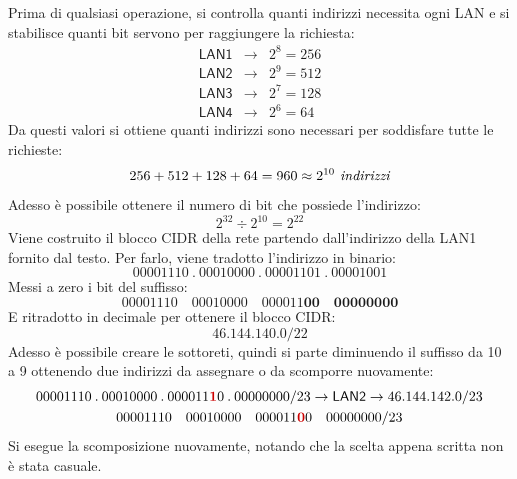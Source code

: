 \documentclass[a4paper]{article}
\newcommand{\binaryaddress}[4]{#1 \hspace{1em} #2 \hspace{1em} #3 \hspace{1em} #4}
\newcommand{\binaryaddresspointed}[4]{#1\:.\:#2\:.\:#3\:.\:#4}
\begin{document}
	\noindent
	Prima di qualsiasi operazione, si controlla quanti indirizzi necessita ogni \textsf{LAN} e si stabilisce quanti bit servono per raggiungere la richiesta:
	\begin{equation*}
		\begin{array}{lll}
			\textsf{LAN1} & \longrightarrow & 2^{8} = 256 \\
			\textsf{LAN2} & \longrightarrow & 2^{9} = 512 \\
			\textsf{LAN3} & \longrightarrow & 2^{7} = 128 \\
			\textsf{LAN4} & \longrightarrow & 2^{6} = 64
		\end{array}
	\end{equation*}
	Da questi valori si ottiene quanti indirizzi sono necessari per soddisfare tutte le richieste:
	\begin{equation*}
		256 + 512 + 128 + 64 = 960 \approx 2^{10} \emph{ indirizzi}
	\end{equation*}
	Adesso è possibile ottenere il numero di bit che possiede l'indirizzo:
	\begin{equation*}
		2^{32} \div 2^{10} = 2^{22}
	\end{equation*}
	Viene costruito il blocco \textsf{CIDR} della rete partendo dall'indirizzo della \textsf{LAN1} fornito dal testo.\newline
	Per farlo, viene tradotto l'indirizzo in binario:
	\begin{equation*}
		\binaryaddresspointed{00001110}{00010000}{00001101}{00001001}
	\end{equation*}
	Messi a zero i bit del suffisso:
	\begin{equation*}
		\binaryaddress{00001110}{00010000}{000011\boldsymbol{00}}{\boldsymbol{00000000}}
	\end{equation*}
	E ritradotto in decimale per ottenere il blocco \textsf{CIDR}:
	\begin{equation*}
		46.144.140.0/22
	\end{equation*}
	Adesso è possibile creare le sottoreti, quindi si parte diminuendo il suffisso da 10 a 9 ottenendo due indirizzi da assegnare o da scomporre nuovamente:
	\begin{gather*}
		\binaryaddresspointed{00001110}{00010000}{000011\textcolor{Red3}{\boldsymbol{1}}0}{00000000}/23 \rightarrow \textsf{LAN2} \rightarrow 46.144.142.0/23 \\
		\binaryaddress{00001110}{00010000}{000011\textcolor{Red3}{\boldsymbol{0}}0}{00000000}/23
	\end{gather*}
	Si esegue la scomposizione nuovamente, notando che la scelta appena scritta non è stata casuale.\newline
\end{document}
